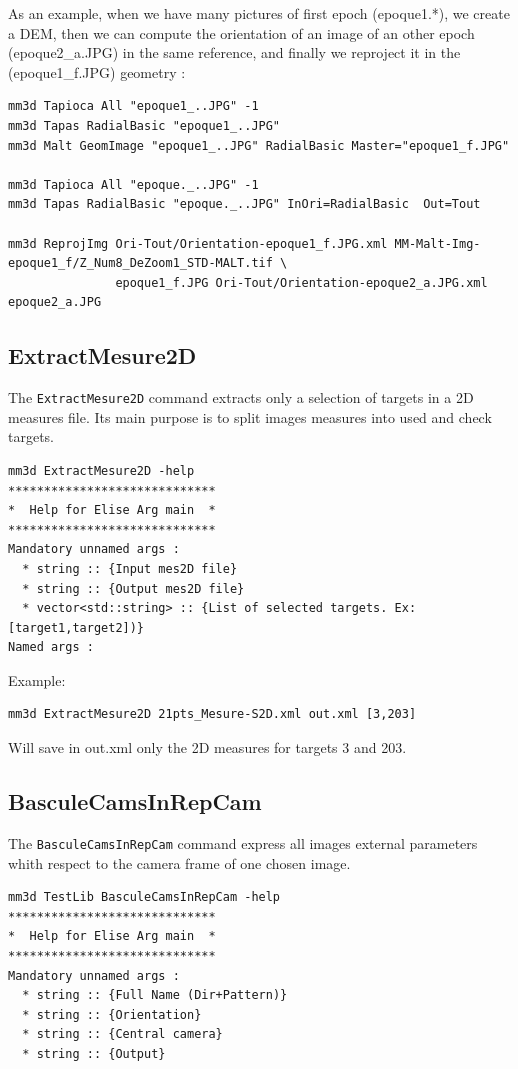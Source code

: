 As an example, when we have many pictures of first epoch (epoque1.*), we create a DEM,
then we can compute the orientation of an image of an other epoch (epoque2\_a.JPG) in the same reference,
and finally we reproject it in the (epoque1\_f.JPG) geometry :
\begin{verbatim}
mm3d Tapioca All "epoque1_..JPG" -1
mm3d Tapas RadialBasic "epoque1_..JPG"
mm3d Malt GeomImage "epoque1_..JPG" RadialBasic Master="epoque1_f.JPG"

mm3d Tapioca All "epoque._..JPG" -1
mm3d Tapas RadialBasic "epoque._..JPG" InOri=RadialBasic  Out=Tout

mm3d ReprojImg Ori-Tout/Orientation-epoque1_f.JPG.xml MM-Malt-Img-epoque1_f/Z_Num8_DeZoom1_STD-MALT.tif \
               epoque1_f.JPG Ori-Tout/Orientation-epoque2_a.JPG.xml epoque2_a.JPG
\end{verbatim}

\subsection{ExtractMesure2D}
The {\tt ExtractMesure2D} command extracts only a selection of targets in a 2D measures file. Its main purpose is to split images measures into used and check targets.

\begin{verbatim}
mm3d ExtractMesure2D -help
*****************************
*  Help for Elise Arg main  *
*****************************
Mandatory unnamed args : 
  * string :: {Input mes2D file}
  * string :: {Output mes2D file}
  * vector<std::string> :: {List of selected targets. Ex: [target1,target2])}
Named args : 
\end{verbatim}

Example:
\begin{verbatim}
mm3d ExtractMesure2D 21pts_Mesure-S2D.xml out.xml [3,203]
\end{verbatim}
Will save in out.xml only the 2D measures for targets 3 and 203.

\subsection{BasculeCamsInRepCam}
The {\tt BasculeCamsInRepCam} command express all images external parameters whith respect to the camera frame of one chosen image.

\begin{verbatim}
mm3d TestLib BasculeCamsInRepCam -help
*****************************
*  Help for Elise Arg main  *
*****************************
Mandatory unnamed args : 
  * string :: {Full Name (Dir+Pattern)}
  * string :: {Orientation}
  * string :: {Central camera}
  * string :: {Output}
\end{verbatim}

